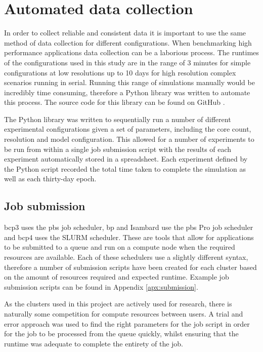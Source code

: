 \documentclass[a4paper,11pt]{report}
\begin{document}
\section{Automated data collection}
In order to collect reliable and consistent data it is important to use the same method of data collection for different configurations. When benchmarking high performance applications data collection can be a laborious process. The runtimes of the configurations used in this study are in the range of 3 minutes for simple configurations at low resolutions up to 10 days for high resolution complex scenarios running in serial. Running this range of simulations manually would be incredibly time consuming, therefore a Python library was written to automate this process. The source code for this library can be found on GitHub \cite{lancaster2019github}. 
\par
The Python library was written to sequentially run a number of different experimental configurations given a set of parameters, including the core count, resolution and model configuration. This allowed for a number of experiments to be run from within a single job submission script with the results of each experiment automatically stored in a spreadsheet. Each experiment defined by the Python script recorded the total time taken to complete the simulation as well as each thirty-day epoch. 


\subsection{Job submission}
\gls{bcp3} uses the \gls{pbs} job scheduler, \gls{bp} and Isambard use the \gls{pbs} Pro job scheduler and \gls{bcp4} uses the SLURM scheduler. These are tools that allow for applications to be submitted to a queue and run on a compute node when the required resources are available. Each of these schedulers use a slightly different syntax, therefore a number of submission scripts have been created for each cluster based on the amount of resources required and expected runtime. Example job submission scripts can be found in Appendix \ref{apx:submission}. 
\par
As the clusters used in this project are actively used for research, there is naturally some competition for compute resources between users. A trial and error approach was used to find the right parameters for the job script in order for the job to be processed from the queue quickly, whilst ensuring that the runtime was adequate to complete the entirety of the job.
\end{document}
